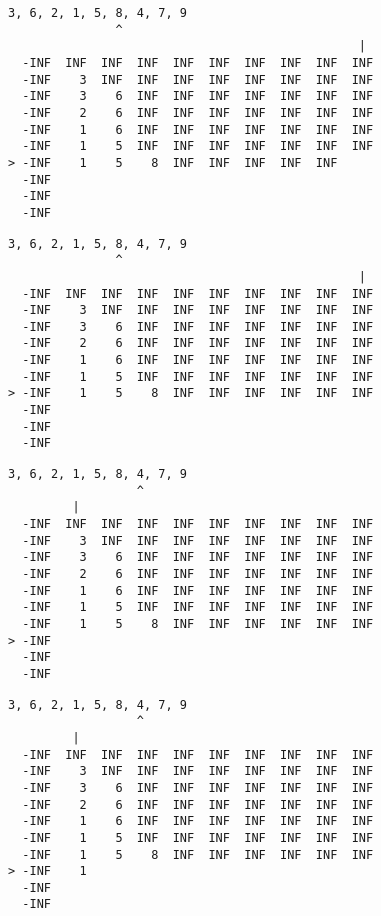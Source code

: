 { \begin{verbatim}
3, 6, 2, 1, 5, 8, 4, 7, 9
               ^
                                                 |
  -INF  INF  INF  INF  INF  INF  INF  INF  INF  INF
  -INF    3  INF  INF  INF  INF  INF  INF  INF  INF
  -INF    3    6  INF  INF  INF  INF  INF  INF  INF
  -INF    2    6  INF  INF  INF  INF  INF  INF  INF
  -INF    1    6  INF  INF  INF  INF  INF  INF  INF
  -INF    1    5  INF  INF  INF  INF  INF  INF  INF
> -INF    1    5    8  INF  INF  INF  INF  INF     
  -INF                                             
  -INF                                             
  -INF                                             
\end{verbatim} }

{ \begin{verbatim}
3, 6, 2, 1, 5, 8, 4, 7, 9
               ^
                                                 |
  -INF  INF  INF  INF  INF  INF  INF  INF  INF  INF
  -INF    3  INF  INF  INF  INF  INF  INF  INF  INF
  -INF    3    6  INF  INF  INF  INF  INF  INF  INF
  -INF    2    6  INF  INF  INF  INF  INF  INF  INF
  -INF    1    6  INF  INF  INF  INF  INF  INF  INF
  -INF    1    5  INF  INF  INF  INF  INF  INF  INF
> -INF    1    5    8  INF  INF  INF  INF  INF  INF
  -INF                                             
  -INF                                             
  -INF                                             
\end{verbatim} }

{ \begin{verbatim}
3, 6, 2, 1, 5, 8, 4, 7, 9
                  ^
         |
  -INF  INF  INF  INF  INF  INF  INF  INF  INF  INF
  -INF    3  INF  INF  INF  INF  INF  INF  INF  INF
  -INF    3    6  INF  INF  INF  INF  INF  INF  INF
  -INF    2    6  INF  INF  INF  INF  INF  INF  INF
  -INF    1    6  INF  INF  INF  INF  INF  INF  INF
  -INF    1    5  INF  INF  INF  INF  INF  INF  INF
  -INF    1    5    8  INF  INF  INF  INF  INF  INF
> -INF                                             
  -INF                                             
  -INF                                             
\end{verbatim} }

{ \begin{verbatim}
3, 6, 2, 1, 5, 8, 4, 7, 9
                  ^
         |
  -INF  INF  INF  INF  INF  INF  INF  INF  INF  INF
  -INF    3  INF  INF  INF  INF  INF  INF  INF  INF
  -INF    3    6  INF  INF  INF  INF  INF  INF  INF
  -INF    2    6  INF  INF  INF  INF  INF  INF  INF
  -INF    1    6  INF  INF  INF  INF  INF  INF  INF
  -INF    1    5  INF  INF  INF  INF  INF  INF  INF
  -INF    1    5    8  INF  INF  INF  INF  INF  INF
> -INF    1                                        
  -INF                                             
  -INF                                             
\end{verbatim} }

